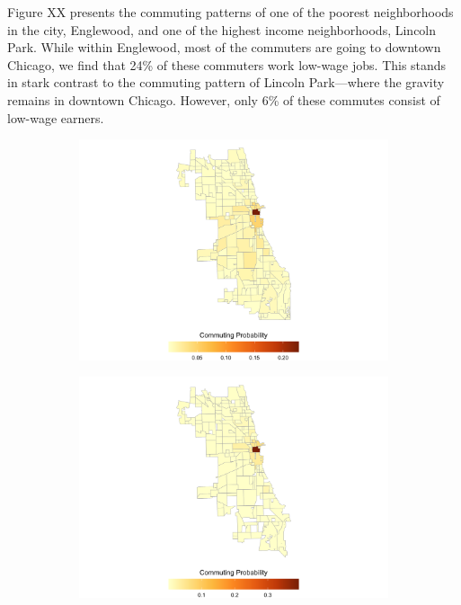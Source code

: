 \documentclass[12pt]{article}
\begin{document}
Figure XX presents the commuting patterns of one of the poorest neighborhoods in the city, Englewood, and one of the highest income neighborhoods, Lincoln Park. While within Englewood, most of the commuters are going to downtown Chicago, we find that 24\% of these commuters work low-wage jobs. This stands in stark contrast to the commuting pattern of Lincoln Park---where the gravity remains in downtown Chicago. However, only 6\% of these commutes consist of low-wage earners. 
\begin{figure}[h!]
\centering
    \caption{Englewood versus Lincoln Park}
    \begin{subfigure}{0.49\textwidth}
         \centering
         \includegraphics[width=\textwidth]{Pset1/code/lodes_diagnostics_files/figure-html/unnamed-chunk-14-1.png}
    \end{subfigure}  
    \begin{subfigure}{0.49\textwidth}
         \centering
         \includegraphics[width=\linewidth]{Pset1/code/lodes_diagnostics_files/figure-html/unnamed-chunk-17-1.png}
    \end{subfigure}
    \label{fig:englewood_lincoln}
\end{figure}
\end{document}
